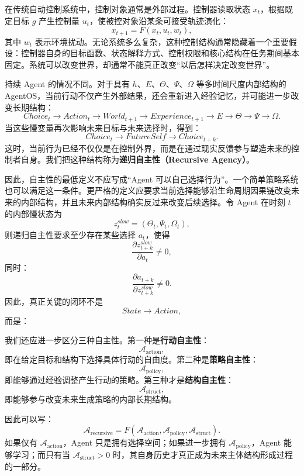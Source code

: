 在传统自动控制系统中，控制对象通常是外部过程。控制器读取状态 $x_t$，根据既定目标 $g$ 产生控制量 $u_t$，使被控对象沿某条可接受轨迹演化：
\[
x_{t+1}
=
F(x_t,u_t,w_t),
\]
其中 $w_t$ 表示环境扰动。无论系统多么复杂，这种控制结构通常隐藏着一个重要假设：控制器自身的目标函数、状态解释方式、控制权限和核心结构在任务期间基本固定。系统可以改变世界，却通常不能真正改变“以后怎样决定改变世界”。

持续 Agent 的情况不同。对于具有 $h$、$E$、$\Theta$、$\Psi$、$\Omega$ 等多时间尺度内部结构的 AgentOS，当前行动不仅产生外部结果，还会重新进入经验记忆，并可能进一步改变长期结构：
\[
Choice_t
\rightarrow
Action_t
\rightarrow
World_{t+1}
\rightarrow
Experience_{t+1}
\rightarrow
E
\rightarrow
\Theta
\rightarrow
\Psi
\rightarrow
\Omega .
\]
当这些慢变量再次影响未来目标与未来选择时，得到：
\[
Choice_t
\rightarrow
FutureSelf
\rightarrow
Choice_{t+k}.
\]
这时，当前行为已经不仅仅是在控制外界，而是在通过现实反馈参与塑造未来的控制者自身。我们把这种结构称为\textbf{递归自主性（Recursive Agency）}。

因此，自主性的最低定义不应写成“Agent 可以自己选择行为”。一个简单策略系统也可以满足这一条件。更严格的定义应要求当前选择能够沿生命周期因果链改变未来的内部结构，并且未来内部结构确实反过来改变后续选择。令 Agent 在时刻 $t$ 的内部慢状态为
\[
z_t^{slow}
=
(\Theta_t,\Psi_t,\Omega_t),
\]
则递归自主性要求至少存在某些选择 $a_t$，使得
\[
\frac{\partial z_{t+k}^{slow}}{\partial a_t}
\neq 0 ,
\]
同时：
\[
\frac{\partial a_{t+k}}{\partial z_{t+k}^{slow}}
\neq 0 .
\]
因此，真正关键的闭环不是
\[
State\rightarrow Action,
\]
而是：
\begin{statementbox}
\centering
{}
\end{statementbox}

我们还应进一步区分三种自主性。第一种是\textbf{行动自主性}：
\[
\mathcal A_{\mathrm{action}},
\]
即在给定目标和结构下选择具体行动的自由度。第二种是\textbf{策略自主性}：
\[
\mathcal A_{\mathrm{policy}},
\]
即能够通过经验调整产生行动的策略。第三种才是\textbf{结构自主性}：
\[
\mathcal A_{\mathrm{struct}},
\]
即能够参与改变未来生成策略的内部长期结构。

因此可以写：
\[
\mathcal A_{\mathrm{recursive}}
=
F(
\mathcal A_{\mathrm{action}},
\mathcal A_{\mathrm{policy}},
\mathcal A_{\mathrm{struct}}
).
\]
如果仅有 $\mathcal A_{\mathrm{action}}$，Agent 只是拥有选择空间；如果进一步拥有 $\mathcal A_{\mathrm{policy}}$，Agent 能够学习；而只有当 $\mathcal A_{\mathrm{struct}}>0$ 时，其自身历史才真正成为未来主体结构形成过程的一部分。

